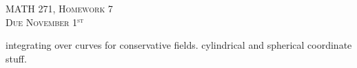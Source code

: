 \documentclass[12pt]{article} %
\begin{document}
\begin{center}
   \textsc{\large MATH 271, Homework 7}\\
   \textsc{Due November 1$^\textrm{st}$}
\end{center}
\vspace{.5cm}

integrating over curves for conservative fields.  cylindrical and spherical coordinate stuff.
\end{document}
